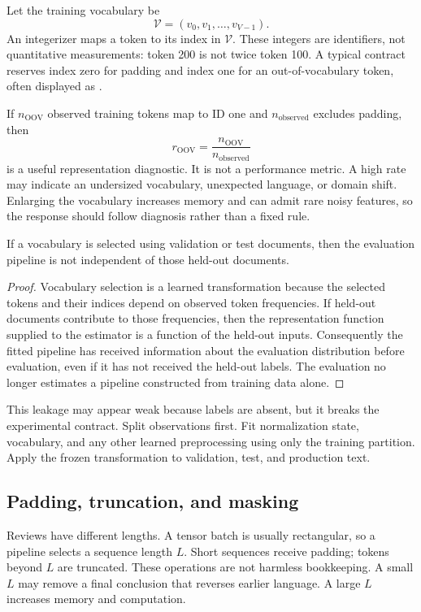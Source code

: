Let the training vocabulary be
\[
  \mathcal V=(v_0,v_1,\ldots,v_{V-1}).
\]
An integerizer maps a token to its index in $\mathcal V$. These integers are
identifiers, not quantitative measurements: token 200 is not twice token 100.
A typical contract reserves index zero for padding and index one for an
out-of-vocabulary token, often displayed as \code{[UNK]}.

If $n_{\mathrm{OOV}}$ observed training tokens map to ID one and
$n_{\mathrm{observed}}$ excludes padding, then
\[
  r_{\mathrm{OOV}}=
  \frac{n_{\mathrm{OOV}}}{n_{\mathrm{observed}}}
\]
is a useful representation diagnostic. It is not a performance metric. A high
rate may indicate an undersized vocabulary, unexpected language, or domain
shift. Enlarging the vocabulary increases memory and can admit rare noisy
features, so the response should follow diagnosis rather than a fixed rule.

\begin{proposition}
If a vocabulary is selected using validation or test documents, then the
evaluation pipeline is not independent of those held-out documents.
\end{proposition}

\begin{proof}
Vocabulary selection is a learned transformation because the selected tokens
and their indices depend on observed token frequencies. If held-out documents
contribute to those frequencies, then the representation function supplied to
the estimator is a function of the held-out inputs. Consequently the fitted
pipeline has received information about the evaluation distribution before
evaluation, even if it has not received the held-out labels. The evaluation no
longer estimates a pipeline constructed from training data alone.
\end{proof}

This leakage may appear weak because labels are absent, but it breaks the
experimental contract. Split observations first. Fit normalization state,
vocabulary, and any other learned preprocessing using only the training
partition. Apply the frozen transformation to validation, test, and production
text.

\subsection{Padding, truncation, and masking}

Reviews have different lengths. A tensor batch is usually rectangular, so a
pipeline selects a sequence length $L$. Short sequences receive padding;
tokens beyond $L$ are truncated. These operations are not harmless bookkeeping.
A small $L$ may remove a final conclusion that reverses earlier language. A
large $L$ increases memory and computation.

